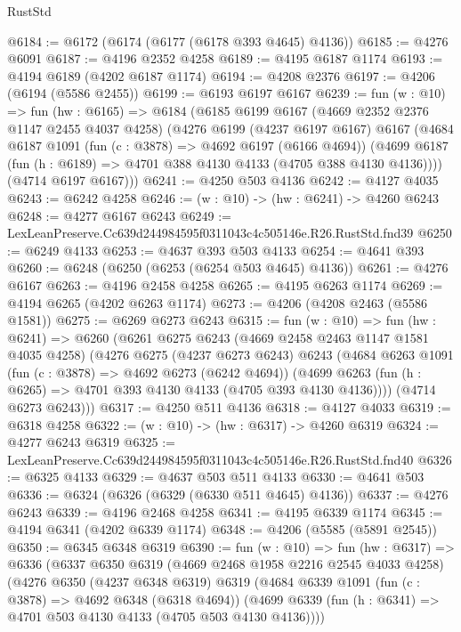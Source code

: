 \begin{lexlean}{RustStd}
\begin{coremodule}
@6184 := @6172 (@6174 (@6177 (@6178 @393 @4645) @4136))
@6185 := @4276 @6091
@6187 := @4196 @2352 @4258
@6189 := @4195 @6187 @1174
@6193 := @4194 @6189 (@4202 @6187 @1174)
@6194 := @4208 @2376
@6197 := @4206 (@6194 (@5586 @2455))
@6199 := @6193 @6197 @6167
@6239 := fun (w : @10) =>
  fun (hw : @6165) =>
  @6184
    (@6185
      @6199
      @6167
      (@4669 @2352 @2376 @1147 @2455 @4037 @4258)
      (@4276
        @6199
        (@4237 @6197 @6167)
        @6167
        (@4684
          @6187
          @1091
          (fun (c : @3878) => @4692 @6197 (@6166 @4694))
          (@4699 @6187 (fun (h : @6189) => @4701 @388 @4130 @4133 (@4705 @388 @4130 @4136))))
        (@4714 @6197 @6167)))
@6241 := @4250 @503 @4136
@6242 := @4127 @4035
@6243 := @6242 @4258
@6246 := (w : @10) -> (hw : @6241) -> @4260 @6243
@6248 := @4277 @6167 @6243
@6249 := LexLeanPreserve.Cc639d244984595f0311043c4c505146e.R26.RustStd.fnd39
@6250 := @6249 @4133
@6253 := @4637 @393 @503 @4133
@6254 := @4641 @393
@6260 := @6248 (@6250 (@6253 (@6254 @503 @4645) @4136))
@6261 := @4276 @6167
@6263 := @4196 @2458 @4258
@6265 := @4195 @6263 @1174
@6269 := @4194 @6265 (@4202 @6263 @1174)
@6273 := @4206 (@4208 @2463 (@5586 @1581))
@6275 := @6269 @6273 @6243
@6315 := fun (w : @10) =>
  fun (hw : @6241) =>
  @6260
    (@6261
      @6275
      @6243
      (@4669 @2458 @2463 @1147 @1581 @4035 @4258)
      (@4276
        @6275
        (@4237 @6273 @6243)
        @6243
        (@4684
          @6263
          @1091
          (fun (c : @3878) => @4692 @6273 (@6242 @4694))
          (@4699 @6263 (fun (h : @6265) => @4701 @393 @4130 @4133 (@4705 @393 @4130 @4136))))
        (@4714 @6273 @6243)))
@6317 := @4250 @511 @4136
@6318 := @4127 @4033
@6319 := @6318 @4258
@6322 := (w : @10) -> (hw : @6317) -> @4260 @6319
@6324 := @4277 @6243 @6319
@6325 := LexLeanPreserve.Cc639d244984595f0311043c4c505146e.R26.RustStd.fnd40
@6326 := @6325 @4133
@6329 := @4637 @503 @511 @4133
@6330 := @4641 @503
@6336 := @6324 (@6326 (@6329 (@6330 @511 @4645) @4136))
@6337 := @4276 @6243
@6339 := @4196 @2468 @4258
@6341 := @4195 @6339 @1174
@6345 := @4194 @6341 (@4202 @6339 @1174)
@6348 := @4206 (@5585 (@5891 @2545))
@6350 := @6345 @6348 @6319
@6390 := fun (w : @10) =>
  fun (hw : @6317) =>
  @6336
    (@6337
      @6350
      @6319
      (@4669 @2468 @1958 @2216 @2545 @4033 @4258)
      (@4276
        @6350
        (@4237 @6348 @6319)
        @6319
        (@4684
          @6339
          @1091
          (fun (c : @3878) => @4692 @6348 (@6318 @4694))
          (@4699 @6339 (fun (h : @6341) => @4701 @503 @4130 @4133 (@4705 @503 @4130 @4136))))

\end{coremodule}
\end{lexlean}
